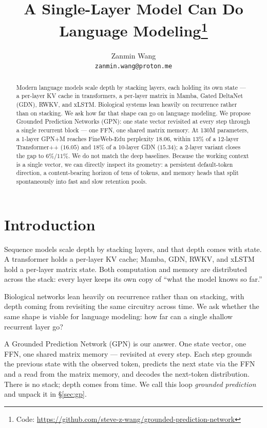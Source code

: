 \documentclass{article}
\title{A Single-Layer Model Can Do Language Modeling\thanks{Code: \url{https://github.com/steve-z-wang/grounded-prediction-network}}}
\author{%
  Zanmin Wang \\
  \texttt{zanmin.wang@proton.me}
}
\begin{document}
\maketitle

\begin{abstract}
Modern language models scale depth by stacking layers, each holding
its own state --- a per-layer KV cache in transformers, a per-layer
matrix in Mamba, Gated DeltaNet (GDN), RWKV, and xLSTM. Biological
systems lean heavily on recurrence rather than on stacking. We ask
how far that shape can go on language modeling. We propose Grounded
Prediction Networks (GPN): one state vector revisited at every step
through a single recurrent block --- one FFN, one shared matrix
memory. At 130M parameters, a 1-layer GPN+M reaches FineWeb-Edu
perplexity $18.06$, within $13\%$ of a 12-layer Transformer++
($16.05$) and $18\%$ of a 10-layer GDN ($15.34$); a 2-layer variant
closes the gap to $6\%/11\%$. We do not match the deep
baselines. Because the working context is a single vector, we can
directly inspect its geometry: a persistent default-token direction,
a content-bearing horizon of tens of tokens, and memory heads that
split spontaneously into fast and slow retention pools.
\end{abstract}

\section{Introduction}

Sequence models scale depth by stacking layers, and that depth comes
with state. A transformer holds a per-layer KV cache; Mamba, GDN,
RWKV, and xLSTM hold a per-layer matrix state. Both computation and
memory are distributed across the stack: every layer keeps its own
copy of ``what the model knows so far.''

Biological networks lean heavily on recurrence rather than on
stacking, with depth coming from revisiting the same circuitry
across time. We ask whether the same shape is viable for language
modeling: how far can a single shallow recurrent layer go?

A Grounded Prediction Network (GPN) is our answer. One state vector,
one FFN, one shared matrix memory --- revisited at every step. Each
step grounds the previous state with the observed token, predicts
the next state via the FFN and a read from the matrix memory, and
decodes the next-token distribution. There is no stack; depth comes
from time. We call this loop \emph{grounded prediction} and unpack it
in \S\ref{sec:gp}.
\end{document}
